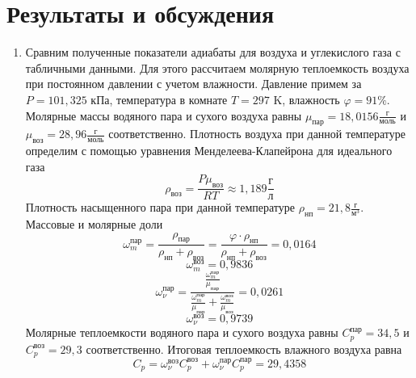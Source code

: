 \documentclass[a4paper]{article}
\begin{document}
\section{Результаты и обсуждения}
\begin{enumerate}
\item Сравним полученные показатели адиабаты для воздуха и углекислого газа с табличными данными\footnotemark[1]. Для этого рассчитаем молярную теплоемкость воздуха при постоянном давлении с учетом влажности. Давление примем за $P = 101,325$ кПа, температура в комнате $T = 297$ K, влажность $\varphi = 91 \%$. Молярные массы водяного пара и сухого воздуха равны $\mu_{\text{пар}} = 18,0156 \frac{\text{г}}{\text{моль}}$ и $\mu_{\text{воз}} = 28,96 \frac{\text{г}}{\text{моль}}$ соответственно. Плотность воздуха при данной температуре определим с помощью уравнения Менделеева-Клапейрона для идеального газа
\begin{equation*}
	\rho_{\text{воз}} = \frac{P\mu_{\text{воз}}}{RT} \approx 1,189 \frac{\text{г}}{\text{л}}
\end{equation*}
Плотность насыщенного пара при данной температуре $\rho_{\text{нп}} = 21,8 \frac{\text{г}}{\text{м}^3}$.
Массовые и молярные доли
\begin{equation*}
	\omega_m^{\text{пар}} = \frac{\rho_{\text{пар}}}{\rho_{\text{нп}} + \rho_{\text{воз}}} = \frac{\varphi \cdot \rho_{\text{нп}}}{\rho_{\text{нп}} + \rho_{\text{воз}}} = 0,0164
\end{equation*}
\begin{equation*}
	\omega_m^{\text{воз}} = 0,9836
\end{equation*}
\begin{equation*}
	\omega_\nu^{\text{пар}} = \frac{\frac{\omega_m^{\text{пар}}}{\mu_{\text{пар}}}}{\frac{\omega_m^{\text{пар}}}{\mu_{\text{пар}}} + \frac{\omega_m^{\text{воз}}}{\mu_{\text{воз}}}} = 0,0261
\end{equation*}
\begin{equation*}
	\omega_\nu^{\text{воз}} = 0,9739
\end{equation*}
Молярные теплоемкости водяного пара и сухого воздуха равны $C_p^{\text{пар}} = 34,5$ и $C_p^{\text{воз}} = 29,3$ соответственно. Итоговая теплоемкость влажного воздуха равна
\begin{equation*}
	C_p = \omega_\nu^{\text{воз}}C_p^{\text{воз}} + \omega_\nu^{\text{пар}}C_p^{\text{пар}} = 29,4358
\end{equation*}

\end{enumerate}
\end{document}
